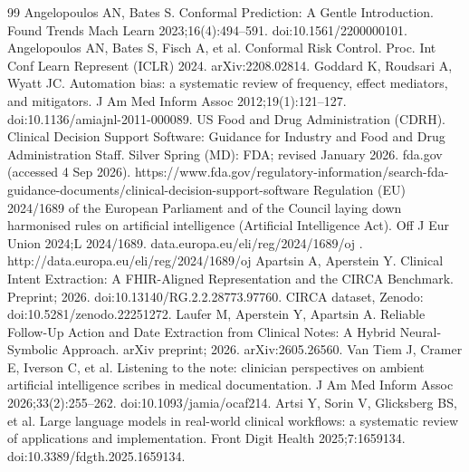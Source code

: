 \begin{thebibliography}{99}
\label{r65} Angelopoulos AN, Bates S. Conformal Prediction: A Gentle Introduction. Found Trends Mach Learn 2023;16(4):494--591. doi:10.1561/2200000101.
\label{r66} Angelopoulos AN, Bates S, Fisch A, et al. Conformal Risk Control. Proc. Int Conf Learn Represent (ICLR) 2024. arXiv:2208.02814.
\label{r67} Goddard K, Roudsari A, Wyatt JC. Automation bias: a systematic review of frequency, effect mediators, and mitigators. J Am Med Inform Assoc 2012;19(1):121--127. doi:10.1136/amiajnl-2011-000089.
\label{r68} US Food and Drug Administration (CDRH). Clinical Decision Support Software: Guidance for Industry and Food and Drug Administration Staff. Silver Spring (MD): FDA; revised January 2026. fda.gov (accessed 4 Sep 2026). https://www.fda.gov/regulatory-information/search-fda-guidance-documents/clinical-decision-support-software
\label{r69} Regulation (EU) 2024/1689 of the European Parliament and of the Council laying down harmonised rules on artificial intelligence (Artificial Intelligence Act). Off J Eur Union 2024;L 2024/1689. data.europa.eu/eli/reg/2024/1689/oj . http://data.europa.eu/eli/reg/2024/1689/oj
\label{r70} Apartsin A, Aperstein Y. Clinical Intent Extraction: A FHIR-Aligned Representation and the CIRCA Benchmark. Preprint; 2026. doi:10.13140/RG.2.2.28773.97760. CIRCA dataset, Zenodo: doi:10.5281/zenodo.22251272.
\label{r71} Laufer M, Aperstein Y, Apartsin A. Reliable Follow-Up Action and Date Extraction from Clinical Notes: A Hybrid Neural-Symbolic Approach. arXiv preprint; 2026. arXiv:2605.26560.
\label{r72} Van Tiem J, Cramer E, Iverson C, et al. Listening to the note: clinician perspectives on ambient artificial intelligence scribes in medical documentation. J Am Med Inform Assoc 2026;33(2):255--262. doi:10.1093/jamia/ocaf214.
\label{r73} Artsi Y, Sorin V, Glicksberg BS, et al. Large language models in real-world clinical workflows: a systematic review of applications and implementation. Front Digit Health 2025;7:1659134. doi:10.3389/fdgth.2025.1659134.
\end{thebibliography}
